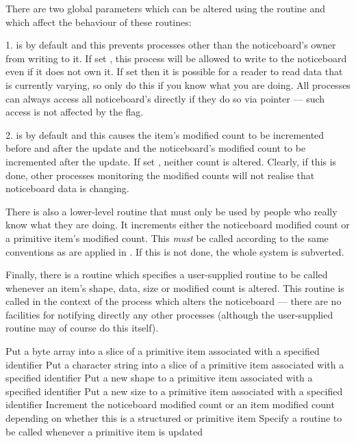       There are two global parameters which can be altered using the
      {} routine and which affect the behaviour %
of these
      routines:

      1. {} is {} by default and this %
prevents processes other
         than the noticeboard's owner from writing to it. If set {%
}, this
         process will be allowed to write to the noticeboard even if it does
         not own it. If set {} then it is possible for a reader %
to read data
         that is currently varying, so only do this if you know what you are
         doing. All processes can always access all noticeboard's directly if
         they do so via pointer --- such access is not affected by the
         {} flag.

      2. {} is {} by default and this %
causes the item's
         modified count to be incremented before and after the update and the
         noticeboard's modified count to be incremented after the update. If
         set {}, neither count is altered. Clearly, if this is %
done, other
         processes monitoring the modified counts will not realise that
         noticeboard data is changing.

      There is also a lower-level routine that must only be used by people who
      really know what they are doing. It increments either the noticeboard
      modified count or a primitive item's modified count. This {\em must} be
      called according to the same conventions as are applied in {}.
      If this is not done, the whole system is subverted.

      Finally, there is a routine which specifies a user-supplied routine to be
      called whenever an item's shape, data, size or modified count is altered.
      This routine is called in the context of the process which alters the
      noticeboard --- there are no facilities for notifying directly any other
      processes (although the user-supplied routine may of course do this
      itself).

\begin{mansectionroutines}
      Put a byte array into a slice of a primitive item
      associated with a specified identifier
      Put a character string into a slice of a primitive item
      associated with a specified identifier
      Put a new shape to a primitive item
      associated with a specified identifier
      Put a new size to a primitive item
      associated with a specified identifier
      Increment the noticeboard modified count or an item modified count
      depending on whether this is a structured or primitive item
      Specify a routine to be called whenever a primitive item is updated
\end{mansectionroutines}

